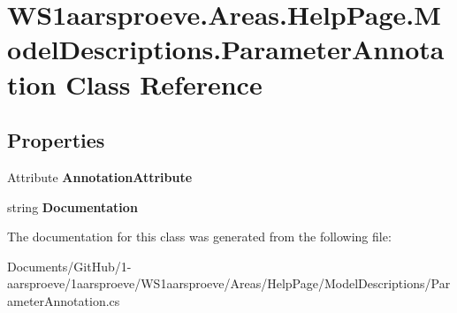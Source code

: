 \hypertarget{class_w_s1aarsproeve_1_1_areas_1_1_help_page_1_1_model_descriptions_1_1_parameter_annotation}{}\section{W\+S1aarsproeve.\+Areas.\+Help\+Page.\+Model\+Descriptions.\+Parameter\+Annotation Class Reference}
\label{class_w_s1aarsproeve_1_1_areas_1_1_help_page_1_1_model_descriptions_1_1_parameter_annotation}
\subsection*{Properties}
\begin{DoxyCompactItemize}
\item 
\hypertarget{class_w_s1aarsproeve_1_1_areas_1_1_help_page_1_1_model_descriptions_1_1_parameter_annotation_a9e96806d194c7fe37c9fe091a8190642}{}Attribute {\bfseries Annotation\+Attribute}\label{class_w_s1aarsproeve_1_1_areas_1_1_help_page_1_1_model_descriptions_1_1_parameter_annotation_a9e96806d194c7fe37c9fe091a8190642}

\item 
\hypertarget{class_w_s1aarsproeve_1_1_areas_1_1_help_page_1_1_model_descriptions_1_1_parameter_annotation_a8e247ddca47ba760b6cc968ecdc9e58a}{}string {\bfseries Documentation}\label{class_w_s1aarsproeve_1_1_areas_1_1_help_page_1_1_model_descriptions_1_1_parameter_annotation_a8e247ddca47ba760b6cc968ecdc9e58a}

\end{DoxyCompactItemize}


The documentation for this class was generated from the following file\+:\begin{DoxyCompactItemize}
\item 
Documents/\+Git\+Hub/1-\/aarsproeve/1aarsproeve/\+W\+S1aarsproeve/\+Areas/\+Help\+Page/\+Model\+Descriptions/Parameter\+Annotation.\+cs\end{DoxyCompactItemize}
